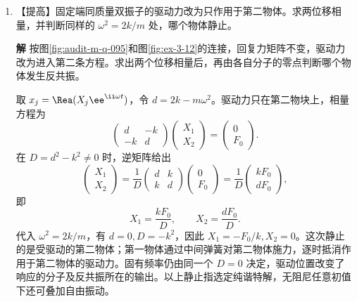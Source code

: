 \documentclass[11pt,openany,fontset=fandol]{ctexbook}
\theoremstyle{plain}\newtheorem{theorem}{定理}[chapter]\newtheorem{proposition}[theorem]{命题}
\theoremstyle{definition}\newtheorem{definition}{定义}[chapter]\newtheorem{example}{例}[chapter]
\theoremstyle{remark}\newtheorem*{remark}{说明}
\newcommand{\SolutionStart}{\par\nobreak\medskip\nobreak\noindent\textbf{解}\quad\ignorespaces}
\newenvironment{solution}{\SolutionStart}{\par\medskip}
\begin{document}
\begin{enumerate}[label=3.\arabic*]
\begin{solution}
在图中的 $t=1$ 处，第一分量已增至 $4/\ee$，总长度也超过初值1；长期衰减与短时增长可以同时出现。
\end{solution}

\item \begin{minipage}[t]{\linewidth}
【提高】固定端同质量双振子的驱动力改为只作用于第二物体。求两位移相量，并判断同样的 $\omega^2=2k/m$ 处，哪个物体静止。

\end{minipage}

\begin{solution}
按图\ref{fig:audit-m-q-095}和图\ref{fig:ex-3-12}的连接，回复力矩阵不变，驱动力改为进入第二条方程。求出两个位移相量后，再由各自分子的零点判断哪个物体发生反共振。

取 $x_j=\Rea(X_j\ee^{\ii\omega t})$，令 $d=2k-m\omega^2$。驱动力只在第二物块上，相量方程为
\[
\begin{pmatrix}d&-k\\-k&d\end{pmatrix}
\begin{pmatrix}X_1\\X_2\end{pmatrix}=\begin{pmatrix}0\\F_0\end{pmatrix}.
\]
在 $D=d^2-k^2\ne0$ 时，逆矩阵给出
\[
\begin{pmatrix}X_1\\X_2\end{pmatrix}
=\frac1D\begin{pmatrix}d&k\\k&d\end{pmatrix}
\begin{pmatrix}0\\F_0\end{pmatrix}
=\frac1D\begin{pmatrix}kF_0\\dF_0\end{pmatrix},
\]
即
\[
X_1=\frac{kF_0}{D},\qquad X_2=\frac{dF_0}{D}.
\]
代入 $\omega^2=2k/m$，有 $d=0,D=-k^2$，因此 $X_1=-F_0/k,X_2=0$。这次静止的是受驱动的第二物体；第一物体通过中间弹簧对第二物体施力，逐时抵消作用于第二物体的驱动力。固有频率仍由同一个 $D=0$ 决定，驱动位置改变了响应的分子及反共振所在的输出。以上静止指选定纯谐特解，无阻尼任意初值下还可叠加自由振动。


\end{solution}
\end{enumerate}
\end{document}
